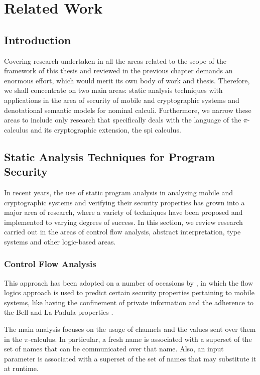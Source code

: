 \documentclass[10pt,a4paper,final,oneside,fleqn]{book}
\begin{document}
\chapter{Related Work}
\section{Introduction}
Covering research undertaken in all the areas related to the scope of the framework of this thesis and reviewed in the previous chapter demands an enormous effort, which would merit its own body of work and thesis.  Therefore, we shall concentrate on two main areas: static analysis techniques with applications in the area of security of mobile and cryptographic systems and denotational semantic models for nominal calculi.  Furthermore, we narrow these areas to include only research that specifically deals with the language of the $\pi$-calculus and its cryptographic extension, the spi calculus.
\section{Static Analysis Techniques for Program Security}
In recent years, the use of static program analysis in analysing mobile and cryptographic systems and verifying their security properties has grown into a major area of research, where a variety of techniques have been proposed and implemented to varying degrees of success.  In this section, we review research carried out in the areas of control flow analysis, abstract interpretation, type systems and other logic-based areas.

\subsection{Control Flow Analysis}
This approach has been adopted on a number of occasions by \cite{bodei1,bodei2,bodei3,bodei4}, in which the flow logics approach \cite{nielson2} is used to predict certain security properties pertaining to mobile systems, like having the confinement of private information and the adherence to the Bell and La Padula properties \cite{bell1}.

The main analysis focuses on the usage of channels and the values sent over them in the $\pi$-calculus.  In particular, a fresh name is associated with a superset of the set of names that can be communicated over that name.  Also, an input parameter is associated with a superset of the set of names that may substitute it at runtime.
\end{document}
